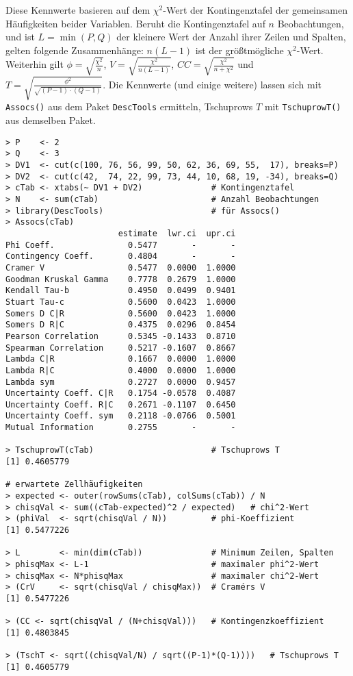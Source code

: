 Diese Kennwerte basieren auf dem $\chi^{2}$-Wert der Kontingenztafel der gemeinsamen Häufigkeiten beider Variablen. Beruht die Kontingenztafel auf $n$ Beobachtungen, und ist $L = \min({P, Q})$ der kleinere Wert der Anzahl ihrer Zeilen und Spalten, gelten folgende Zusammenhänge: $n (L-1)$ ist der größtmögliche $\chi^{2}$-Wert. Weiterhin gilt $\phi = \sqrt{\frac{\chi^{2}}{n}}$, $V = \sqrt{\frac{\chi^{2}}{n (L-1)}}$, $CC = \sqrt{\frac{\chi^{2}}{n + \chi^{2}}}$ und $T = \sqrt{\frac{\phi^{2}}{\sqrt{(P-1) \cdot (Q-1)}}}$. Die Kennwerte (und einige weitere) lassen sich mit \lstinline!Assocs()! aus dem Paket \lstinline!DescTools! ermitteln, Tschuprows $T$ mit \lstinline!TschuprowT()! aus demselben Paket.
\begin{lstlisting}
> P    <- 2
> Q    <- 3
> DV1  <- cut(c(100, 76, 56, 99, 50, 62, 36, 69, 55,  17), breaks=P)
> DV2  <- cut(c(42,  74, 22, 99, 73, 44, 10, 68, 19, -34), breaks=Q)
> cTab <- xtabs(~ DV1 + DV2)              # Kontingenztafel
> N    <- sum(cTab)                       # Anzahl Beobachtungen
> library(DescTools)                      # für Assocs()
> Assocs(cTab)
                       estimate  lwr.ci  upr.ci
Phi Coeff.               0.5477       -       -
Contingency Coeff.       0.4804       -       -
Cramer V                 0.5477  0.0000  1.0000
Goodman Kruskal Gamma    0.7778  0.2679  1.0000
Kendall Tau-b            0.4950  0.0499  0.9401
Stuart Tau-c             0.5600  0.0423  1.0000
Somers D C|R             0.5600  0.0423  1.0000
Somers D R|C             0.4375  0.0296  0.8454
Pearson Correlation      0.5345 -0.1433  0.8710
Spearman Correlation     0.5217 -0.1607  0.8667
Lambda C|R               0.1667  0.0000  1.0000
Lambda R|C               0.4000  0.0000  1.0000
Lambda sym               0.2727  0.0000  0.9457
Uncertainty Coeff. C|R   0.1754 -0.0578  0.4087
Uncertainty Coeff. R|C   0.2671 -0.1107  0.6450
Uncertainty Coeff. sym   0.2118 -0.0766  0.5001
Mutual Information       0.2755       -       -

> TschuprowT(cTab)                        # Tschuprows T
[1] 0.4605779

# erwartete Zellhäufigkeiten
> expected <- outer(rowSums(cTab), colSums(cTab)) / N
> chisqVal <- sum((cTab-expected)^2 / expected)   # chi^2-Wert
> (phiVal  <- sqrt(chisqVal / N))         # phi-Koeffizient
[1] 0.5477226

> L        <- min(dim(cTab))              # Minimum Zeilen, Spalten
> phisqMax <- L-1                         # maximaler phi^2-Wert
> chisqMax <- N*phisqMax                  # maximaler chi^2-Wert
> (CrV     <- sqrt(chisqVal / chisqMax))  # Cramérs V
[1] 0.5477226

> (CC <- sqrt(chisqVal / (N+chisqVal)))   # Kontingenzkoeffizient
[1] 0.4803845

> (TschT <- sqrt((chisqVal/N) / sqrt((P-1)*(Q-1))))   # Tschuprows T
[1] 0.4605779
\end{lstlisting}


